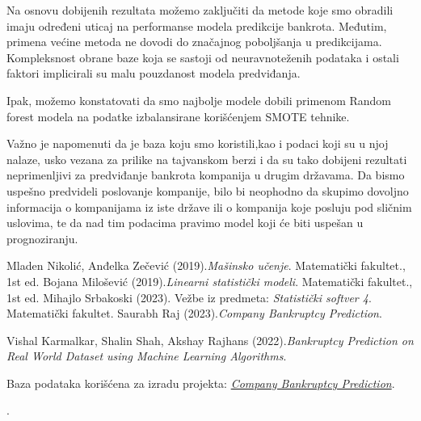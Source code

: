 \documentclass[12pt]{article}
\theoremstyle{definition}
\theoremstyle{remark}
\begin{document}
Na osnovu dobijenih rezultata možemo zaključiti da metode koje smo obradili imaju određeni uticaj na performanse modela predikcije bankrota. Međutim, primena većine metoda ne dovodi do značajnog poboljšanja u predikcijama. Kompleksnost obrane baze koja se sastoji od neuravnoteženih podataka i ostali faktori implicirali su malu pouzdanost modela predviđanja. 

Ipak, možemo konstatovati da smo najbolje modele dobili primenom Random forest modela na podatke izbalansirane korišćenjem SMOTE tehnike.

Važno je napomenuti da je baza koju smo koristili,kao i podaci koji su u njoj nalaze, usko vezana za prilike na tajvanskom berzi i da su tako dobijeni rezultati neprimenljivi za predviđanje bankrota kompanija u drugim državama. Da bismo uspešno predvideli poslovanje kompanije, bilo bi neophodno da skupimo dovoljno informacija o kompanijama iz iste države ili o kompanija koje posluju pod sličnim uslovima, te da nad tim podacima pravimo model koji će biti uspešan u prognoziranju.
\newpage

\begin{thebibliography}{9}
\vspace{1cm}
Mladen Nikolić, Anđelka Zečević (2019).\emph{Mašinsko učenje}. Matematički fakultet., 1st ed.
Bojana Milošević (2019).\emph{Linearni statistički modeli}. Matematički fakultet., 1st ed.
Mihajlo Srbakoski (2023). Vežbe iz predmeta: \emph{Statistički softver 4}. Matematički fakultet.
 Saurabh Raj (2023).\emph{Company Bankruptcy Prediction}.

 Vishal Karmalkar, Shalin Shah,
Akshay Rajhans (2022).\emph{Bankruptcy Prediction on Real World Dataset using Machine Learning Algorithms}.

 Baza podataka korišćena za izradu projekta: \href{https://www.kaggle.com/datasets/fedesoriano/company-bankruptcy-prediction?resource=download}{\emph{Company Bankruptcy Prediction}}.


\end{thebibliography}.
\end{document}
